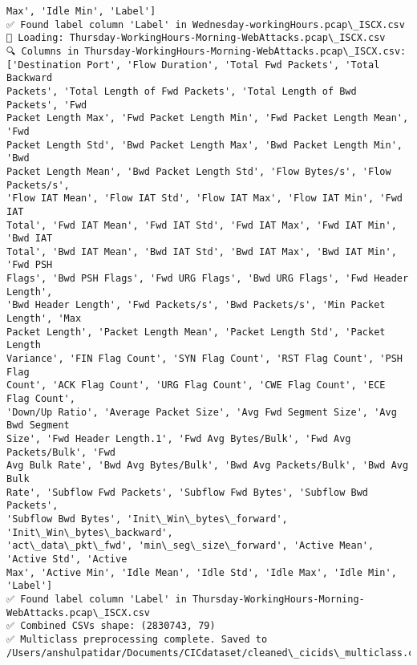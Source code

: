 \documentclass[11pt]{article}
\begin{document}
\begin{Verbatim}[commandchars=\\\{\}]
Max', 'Idle Min', 'Label']
✅ Found label column 'Label' in Wednesday-workingHours.pcap\_ISCX.csv
📅 Loading: Thursday-WorkingHours-Morning-WebAttacks.pcap\_ISCX.csv
🔍 Columns in Thursday-WorkingHours-Morning-WebAttacks.pcap\_ISCX.csv:
['Destination Port', 'Flow Duration', 'Total Fwd Packets', 'Total Backward
Packets', 'Total Length of Fwd Packets', 'Total Length of Bwd Packets', 'Fwd
Packet Length Max', 'Fwd Packet Length Min', 'Fwd Packet Length Mean', 'Fwd
Packet Length Std', 'Bwd Packet Length Max', 'Bwd Packet Length Min', 'Bwd
Packet Length Mean', 'Bwd Packet Length Std', 'Flow Bytes/s', 'Flow Packets/s',
'Flow IAT Mean', 'Flow IAT Std', 'Flow IAT Max', 'Flow IAT Min', 'Fwd IAT
Total', 'Fwd IAT Mean', 'Fwd IAT Std', 'Fwd IAT Max', 'Fwd IAT Min', 'Bwd IAT
Total', 'Bwd IAT Mean', 'Bwd IAT Std', 'Bwd IAT Max', 'Bwd IAT Min', 'Fwd PSH
Flags', 'Bwd PSH Flags', 'Fwd URG Flags', 'Bwd URG Flags', 'Fwd Header Length',
'Bwd Header Length', 'Fwd Packets/s', 'Bwd Packets/s', 'Min Packet Length', 'Max
Packet Length', 'Packet Length Mean', 'Packet Length Std', 'Packet Length
Variance', 'FIN Flag Count', 'SYN Flag Count', 'RST Flag Count', 'PSH Flag
Count', 'ACK Flag Count', 'URG Flag Count', 'CWE Flag Count', 'ECE Flag Count',
'Down/Up Ratio', 'Average Packet Size', 'Avg Fwd Segment Size', 'Avg Bwd Segment
Size', 'Fwd Header Length.1', 'Fwd Avg Bytes/Bulk', 'Fwd Avg Packets/Bulk', 'Fwd
Avg Bulk Rate', 'Bwd Avg Bytes/Bulk', 'Bwd Avg Packets/Bulk', 'Bwd Avg Bulk
Rate', 'Subflow Fwd Packets', 'Subflow Fwd Bytes', 'Subflow Bwd Packets',
'Subflow Bwd Bytes', 'Init\_Win\_bytes\_forward', 'Init\_Win\_bytes\_backward',
'act\_data\_pkt\_fwd', 'min\_seg\_size\_forward', 'Active Mean', 'Active Std', 'Active
Max', 'Active Min', 'Idle Mean', 'Idle Std', 'Idle Max', 'Idle Min', 'Label']
✅ Found label column 'Label' in Thursday-WorkingHours-Morning-
WebAttacks.pcap\_ISCX.csv
✅ Combined CSVs shape: (2830743, 79)
✅ Multiclass preprocessing complete. Saved to
/Users/anshulpatidar/Documents/CICdataset/cleaned\_cicids\_multiclass.csv
    \end{Verbatim}
\end{document}
